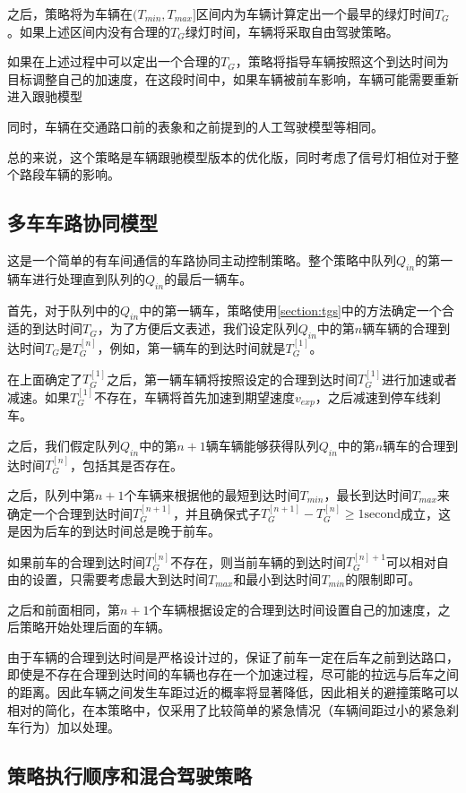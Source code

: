 \documentclass[a4paper,UTF8]{paper}
\begin{document}
之后，策略将为车辆在$(T_{min},T_{max}]$区间内为车辆计算定出一个最早的绿灯时间$T_G$。如果上述区间内没有合理的$T_G$绿灯时间，车辆将采取自由驾驶策略。

如果在上述过程中可以定出一个合理的$T_G$，策略将指导车辆按照这个到达时间为目标调整自己的加速度，在这段时间中，如果车辆被前车影响，车辆可能需要重新进入跟驰模型

同时，车辆在交通路口前的表象和之前提到的人工驾驶模型等相同。

总的来说，这个策略是车辆跟驰模型版本的优化版，同时考虑了信号灯相位对于整个路段车辆的影响。

\subsection{多车车路协同模型}
\label{section:st2}
这是一个简单的有车间通信的车路协同主动控制策略。整个策略中队列$Q_{in}$的第一辆车进行处理直到队列的$Q_{in}$的最后一辆车。

首先，对于队列中的$Q_{in}$中的第一辆车，策略使用\ref{section:tgs}中的方法确定一个合适的到达时间$T_G$，为了方便后文表述，我们设定队列$Q_{in}$中的第$n$辆车辆的合理到达时间$T_G$是$T_G^{[n]}$，例如，第一辆车的到达时间就是$T_G^{[1]}$。

在上面确定了$T_G^{[1]}$之后，第一辆车辆将按照设定的合理到达时间$T_G^{[1]}$进行加速或者减速。如果$T_G^{[1]}$不存在，车辆将首先加速到期望速度$v_{exp}$，之后减速到停车线刹车。

之后，我们假定队列$Q_{in}$中的第$n+1$辆车辆能够获得队列$Q_{in}$中的第$n$辆车的合理到达时间$T_G^{[n]}$，包括其是否存在。

之后，队列中第$n+1$个车辆来根据他的最短到达时间$T_{min}$，最长到达时间$T_{max}$来确定一个合理到达时间$T_G^{[n+1]}$，并且确保式子$T_G^{[n+1]}-T_G^{[n]} \ge 1 \mathrm{second}$成立，这是因为后车的到达时间总是晚于前车。

如果前车的合理到达时间$T_G^{[n]}$不存在，则当前车辆的到达时间$T_G^{[n]+1}$可以相对自由的设置，只需要考虑最大到达时间$T_{max}$和最小到达时间$T_{min}$的限制即可。

之后和前面相同，第$n+1$个车辆根据设定的合理到达时间设置自己的加速度，之后策略开始处理后面的车辆。

由于车辆的合理到达时间是严格设计过的，保证了前车一定在后车之前到达路口，即使是不存在合理到达时间的车辆也存在一个加速过程，尽可能的拉远与后车之间的距离。因此车辆之间发生车距过近的概率将显著降低，因此相关的避撞策略可以相对的简化，在本策略中，仅采用了比较简单的紧急情况（车辆间距过小的紧急刹车行为）加以处理。

\subsection{策略执行顺序和混合驾驶策略}
\end{document}
